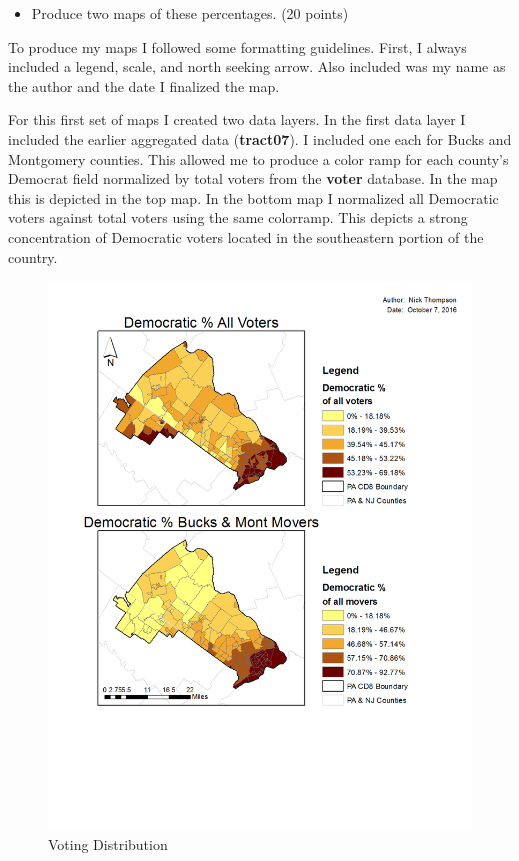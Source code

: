 \documentclass[12pt]{article}
\begin{document}
\begin{itemize}
	\item Produce two maps of these percentages. (20 points)
\end{itemize}

To produce my maps I followed some formatting guidelines.  First, I always included a legend, scale, and north seeking arrow.  Also included was my name as the author and the date I finalized the map.  

For this first set of maps I created two data layers.  In the first data layer I included the earlier aggregated data (\textbf{tract07}).  I included one each for Bucks and Montgomery counties.  This allowed me to produce a color ramp for each county's Democrat field normalized by total voters from the \textbf{voter} database. In the map this is depicted in the top map.  In the bottom map I normalized all Democratic voters against total voters using the same colorramp.    This depicts a strong concentration of Democratic voters located in the southeastern portion of the country. 

\begin{figure}
	\caption{Voting Distribution}
	\centerline{\includegraphics[scale=.75]{question_12.png}} %
\end{figure}
\end{document}
